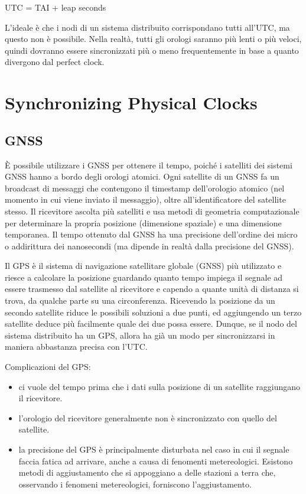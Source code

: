UTC = TAI + leap seconds

L'ideale è che i nodi di un sistema distribuito corrispondano tutti all'UTC, ma questo non è possibile. Nella realtà, tutti gli orologi saranno più lenti o più veloci, quindi dovranno essere sincronizzati più o meno frequentemente in base a quanto divergono dal perfect clock.

\section{Synchronizing Physical Clocks}

\subsection{GNSS}

È possibile utilizzare i GNSS per ottenere il tempo, poiché i satelliti dei sistemi GNSS hanno a bordo degli orologi atomici. Ogni satellite di un GNSS fa un broadcast di messaggi che contengono il timestamp dell'orologio atomico (nel momento in cui viene inviato il messaggio), oltre all'identificatore del satellite stesso. Il ricevitore ascolta più satelliti e usa metodi di geometria computazionale per determinare la propria posizione (dimensione spaziale) e una dimensione temporanea. Il tempo ottenuto dal GNSS ha una precisione dell'ordine dei micro o addirittura dei nanosecondi (ma dipende in realtà dalla precisione del GNSS).

Il GPS è il sistema di navigazione satellitare globale (GNSS) più utilizzato e riesce a calcolare la posizione guardando quanto tempo impiega il segnale ad essere trasmesso dal satellite al ricevitore e capendo a quante unità di distanza si trova, da qualche parte su una circonferenza. Ricevendo la posizione da un secondo satellite riduce le possibili soluzioni a due punti, ed aggiungendo un terzo satellite deduce più facilmente quale dei due possa essere. Dunque, se il nodo del sistema distribuito ha un GPS, allora ha già un modo per sincronizzarsi in maniera abbastanza precisa con l'UTC. 

Complicazioni del GPS:
\begin{itemize}
    \item ci vuole del tempo prima che i dati sulla posizione di un satellite raggiungano il ricevitore. 
    \item l'orologio del ricevitore generalmente non è sincronizzato con quello del satellite.
    \item la precisione del GPS è principalmente disturbata nel caso in cui il segnale faccia fatica ad arrivare, anche a causa di fenomenti metereologici. Esistono metodi di aggiustamento che si appoggiano a delle stazioni a terra che, osservando i fenomeni metereologici, forniscono l'aggiustamento. 
\end{itemize}

